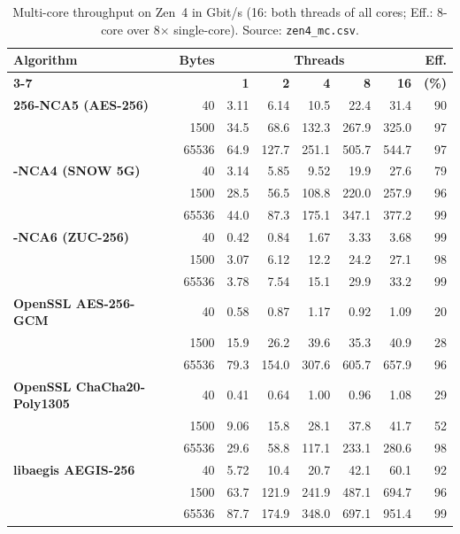 \begin{table}[!htbp]
\centering
\caption{Multi-core throughput on Zen~4 in Gbit/s (16: both threads of all cores; Eff.: 8-core over 8$\times$ single-core). Source: \texttt{zen4\_mc.csv}.}
\label{tab:s-mc-zen4}
\footnotesize
\begin{tabular}{@{}>{\bfseries}l r r r r r r r@{}}
\toprule
\textbf{Algorithm} & \textbf{Bytes} & \multicolumn{5}{c}{\textbf{Threads}} & \textbf{Eff.} \\
\cmidrule(lr){3-7}
& & \textbf{1} & \textbf{2} & \textbf{4} & \textbf{8} & \textbf{16} & \textbf{(\%)} \\
\midrule
256-NCA5 (AES-256) & 40 & 3.11 & 6.14 & 10.5 & 22.4 & 31.4 & 90 \\
 & 1500 & 34.5 & 68.6 & 132.3 & 267.9 & 325.0 & 97 \\
 & 65536 & 64.9 & 127.7 & 251.1 & 505.7 & 544.7 & 97 \\
\addlinespace[2pt]
256-NCA4 (SNOW 5G) & 40 & 3.14 & 5.85 & 9.52 & 19.9 & 27.6 & 79 \\
 & 1500 & 28.5 & 56.5 & 108.8 & 220.0 & 257.9 & 96 \\
 & 65536 & 44.0 & 87.3 & 175.1 & 347.1 & 377.2 & 99 \\
\addlinespace[2pt]
256-NCA6 (ZUC-256) & 40 & 0.42 & 0.84 & 1.67 & 3.33 & 3.68 & 99 \\
 & 1500 & 3.07 & 6.12 & 12.2 & 24.2 & 27.1 & 98 \\
 & 65536 & 3.78 & 7.54 & 15.1 & 29.9 & 33.2 & 99 \\
\addlinespace[2pt]
OpenSSL AES-256-GCM & 40 & 0.58 & 0.87 & 1.17 & 0.92 & 1.09 & 20 \\
 & 1500 & 15.9 & 26.2 & 39.6 & 35.3 & 40.9 & 28 \\
 & 65536 & 79.3 & 154.0 & 307.6 & 605.7 & 657.9 & 96 \\
\addlinespace[2pt]
OpenSSL ChaCha20-Poly1305 & 40 & 0.41 & 0.64 & 1.00 & 0.96 & 1.08 & 29 \\
 & 1500 & 9.06 & 15.8 & 28.1 & 37.8 & 41.7 & 52 \\
 & 65536 & 29.6 & 58.8 & 117.1 & 233.1 & 280.6 & 98 \\
\addlinespace[2pt]
libaegis AEGIS-256 & 40 & 5.72 & 10.4 & 20.7 & 42.1 & 60.1 & 92 \\
 & 1500 & 63.7 & 121.9 & 241.9 & 487.1 & 694.7 & 96 \\
 & 65536 & 87.7 & 174.9 & 348.0 & 697.1 & 951.4 & 99 \\
\bottomrule
\end{tabular}
\end{table}
